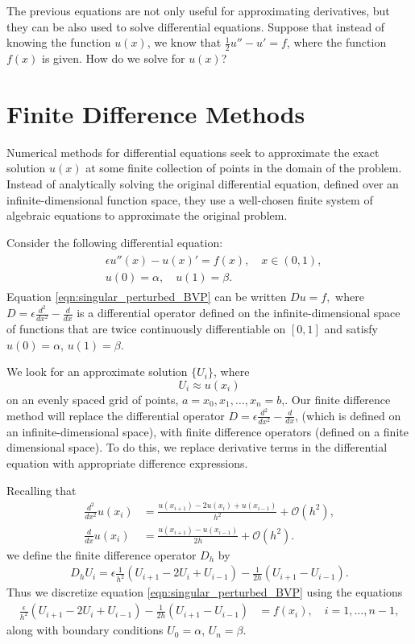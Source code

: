 The previous equations are not only useful for approximating derivatives, but they can be also used to solve differential equations. Suppose that instead of knowing the function $u(x)$, we know that $\frac{1}{2}u'' - u' = f$, where the function $f(x)$ is given. How do we solve for $u(x)$?

\section*{Finite Difference Methods}

Numerical methods for differential equations seek to approximate the exact solution $u(x)$ at some finite collection of points in the domain of the problem.
Instead of analytically solving the original differential equation, defined over an infinite-dimensional function space, they use a well-chosen finite system of algebraic equations to approximate the original problem.

Consider the following differential equation:
\begin{align}
	\begin{split}
	&{ } \epsilon u''(x)-u(x)'= f(x), \quad x \in (0,1), \\
	&{ } u(0) = \alpha, \quad u(1) = \beta.
	\end{split} \label{eqn:singular_perturbed_BVP}
\end{align}
Equation \eqref{eqn:singular_perturbed_BVP} can be written $D u = f,$ where $D = \epsilon \frac{d^2}{dx^2} - \frac{d}{dx}$ is a differential operator defined on the infinite-dimensional space of functions that are twice continuously differentiable on $[0,1]$ and satisfy $u(0) = \alpha$, $u(1) = \beta$.

We look for an approximate solution $\{U_i\}$, where \[U_i \approx u(x_i)\] on an evenly spaced grid of points, $a = x_0, x_1, \ldots, x_n = b$,.
Our finite difference method will replace the differential operator $D = \epsilon \frac{d^2}{dx^2} - \frac{d}{dx}$, (which is defined on an infinite-dimensional space), with finite difference operators (defined on a finite dimensional space).
To do this, we replace derivative terms in the differential equation with appropriate difference expressions.

Recalling that
\begin{align*}
\frac{d^2}{dx^2} u(x_i) &= \frac{u(x_{i+1})- 2u(x_i) + u(x_{i-1})}{h^2} + \mathcal{O}(h^2),\\
\frac{d}{dx} u(x_i) &= \frac{u(x_{i+1})-u(x_{i-1})}{2h} + \mathcal{O}(h^2).
\end{align*}
we define the finite difference operator $D_h$ by
\begin{align}
D_h U_i = \epsilon \frac{1}{h^2}\left(U_{i+1} -2U_i + U_{i-1}\right) - \frac{1}{2h} \left(U_{i+1}-U_{i-1} \right). \label{fd_operator}
\end{align}
Thus we discretize equation \eqref{eqn:singular_perturbed_BVP} using the equations
\begin{align*}
	\frac{\epsilon}{h^2} (U_{i+1}- 2U_i + U_{i-1}) - \frac{1}{2h} \left(U_{i+1}-U_{i-1} \right)  &= f(x_i), \quad i = 1, \ldots, n-1,
\end{align*}
along with boundary conditions $U_{0} = \alpha$, $U_{n} = \beta$.

